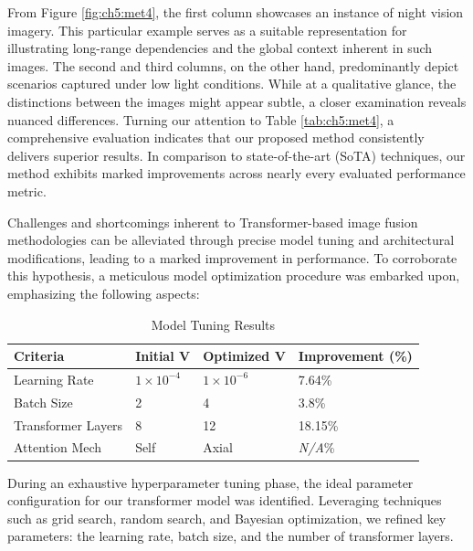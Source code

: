 From Figure \ref{fig:ch5:met4}, the first column showcases an instance of night vision imagery. This particular example serves as a suitable representation for illustrating long-range dependencies and the global context inherent in such images. The second and third columns, on the other hand, predominantly depict scenarios captured under low light conditions. While at a qualitative glance, the distinctions between the images might appear subtle, a closer examination reveals nuanced differences. Turning our attention to Table \ref{tab:ch5:met4}, a comprehensive evaluation indicates that our proposed method consistently delivers superior results. In comparison to state-of-the-art (SoTA) techniques, our method exhibits marked improvements across nearly every evaluated performance metric.

Challenges and shortcomings inherent to Transformer-based image fusion methodologies can be alleviated through precise model tuning and architectural modifications, leading to a marked improvement in performance. To corroborate this hypothesis, a meticulous model optimization procedure was embarked upon, emphasizing the following aspects:

\begin{table}[htbp]
    \centering
    \captionsetup{justification=raggedright,singlelinecheck=false}
        \caption{Model Tuning Results}
    \label{tab:ch5:hypo8results}
    \begin{tabular}{|l|l|l|l|}
        \hline
        \textbf{Criteria} & \textbf{Initial V} & \textbf{Optimized V} & \textbf{Improvement (\%)} \\\hline
        Learning Rate & \(1 \times 10^{-4}\) & \(1 \times 10^{-6}\) & 7.64\% \\\hline
        Batch Size & 2 & 4 & 3.8\% \\\hline
        Transformer Layers & 8 & 12 & 18.15\% \\\hline
        Attention Mech & Self & Axial & \textit{N/A}\% \\\hline
    \end{tabular}
\end{table}

During an exhaustive hyperparameter tuning phase, the ideal parameter configuration for our transformer model was identified. Leveraging techniques such as grid search, random search, and Bayesian optimization, we refined key parameters: the learning rate, batch size, and the number of transformer layers.


